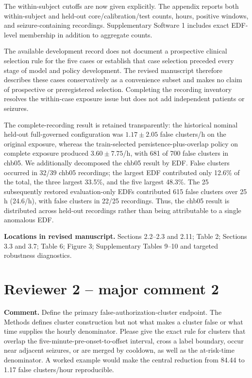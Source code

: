 \documentclass[11pt,a4paper]{article}
\begin{document}
The within-subject cutoffs are now given explicitly. The appendix reports both within-subject and held-out core/calibration/test counts, hours, positive windows, and seizure-containing recordings. Supplementary Software 1 includes exact EDF-level membership in addition to aggregate counts.

The available development record does not document a prospective clinical selection rule for the five cases or establish that case selection preceded every stage of model and policy development. The revised manuscript therefore describes these cases conservatively as a convenience subset and makes no claim of prospective or preregistered selection. Completing the recording inventory resolves the within-case exposure issue but does not add independent patients or seizures.

The complete-recording result is retained transparently: the historical nominal held-out full-governed configuration was $1.17\pm2.05$ false clusters/h on the original exposure, whereas the train-selected persistence-plus-overlap policy on complete exposure produced $3.60\pm7.75$/h, with 681 of 700 false clusters in chb05. We additionally decomposed the chb05 result by EDF. False clusters occurred in 32/39 chb05 recordings; the largest EDF contributed only 12.6\% of the total, the three largest 33.5\%, and the five largest 48.3\%. The 25 subsequently restored evaluation-only EDFs contributed 615 false clusters over 25 h (24.6/h), with false clusters in 22/25 recordings. Thus, the chb05 result is distributed across held-out recordings rather than being attributable to a single anomalous EDF.

\textbf{Locations in revised manuscript.} Sections 2.2--2.3 and 2.11; Table 2; Sections 3.3 and 3.7; Table 6; Figure 3; Supplementary Tables 9--10 and targeted robustness diagnostics.

\section*{Reviewer 2 -- major comment 2}

\textbf{Comment.} Define the primary false-authorization-cluster endpoint. The Methods defines cluster construction but not what makes a cluster false or what time supplies the hourly denominator. Please give the exact rule for clusters that overlap the five-minute-pre-onset-to-offset interval, cross a label boundary, occur near adjacent seizures, or are merged by cooldown, as well as the at-risk-time denominator. A worked example would make the central reduction from 84.44 to 1.17 false clusters/hour reproducible.
\end{document}
